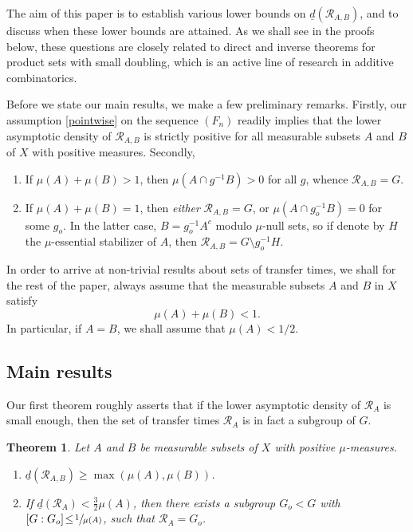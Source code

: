 \documentclass[JEP,XML,SOM,Unicode]{cedram}
\let\mathcal\mathscr
\newcommand{\cR}{\mathcal{R}}
\theoremstyle{plain}
\newtheorem{theorem}{Theorem}[section]
\theoremstyle{definition}
\begin{document}
The aim of this paper is to establish various lower bounds on $\underline{d}(\cR_{A,B})$, and to discuss when these lower bounds are attained. As we shall see in the proofs below, these questions are closely related to direct and inverse theorems for product sets with small doubling, which is an active line of research in additive combinatorics.

Before we state our main results, we make a few preliminary remarks. Firstly, our assumption \eqref{pointwise} on the sequence $(F_n)$ readily implies that the lower asymptotic density of $\cR_{A,B}$ is strictly positive for all measurable subsets $A$ and $B$ of $X$ with positive measures. Secondly,

\begin{enumerate}
\item
If $\mu(A) + \mu(B) > 1$, then $\mu(A \cap g^{-1}B) >0$ for all $g$, whence $\cR_{A,B} = G$.
\item
If $\mu(A) + \mu(B) = 1$, then \emph{either} $\cR_{A,B} = G$, or $\mu(A \cap g_o^{-1}B) = 0$ for some $g_o$.
In the latter case, $B = g_o^{-1}A^c$ modulo $\mu$-null sets, so if denote by $H$ the $\mu$-essential stabilizer of $A$,
then $\cR_{A,B} = G \setminus g_o^{-1} H$.
\end{enumerate}

In order to arrive at non-trivial results about sets of transfer times, we shall for the rest of the paper, always assume that the measurable
subsets $A$ and $B$ in $X$ satisfy
\begin{equation}
\label{standass}
\mu(A) + \mu(B) < 1.
\end{equation}
In particular, if $A = B$, we shall assume that $\mu(A) < 1/2$.

\subsection{Main results}

Our first theorem roughly asserts that if the lower asymptotic density of $\cR_A$ is small enough, then the set of transfer times $\cR_A$ is in fact a
subgroup of $G$.
\begin{theorem}
\label{thm1}
Let $A$ and $B$ be measurable subsets of $X$ with positive $\mu$-measures.

\begin{enumerate}
\item\label{thm1i}
$\underline{d}(\cR_{A,B}) \geq \max(\mu(A),\mu(B))$.
\item\label{thm1ii}
If $\underline{d}(\cR_A)\!<\!\frac{3}{2} \mu(A)$, then there exists a subgroup $G_o\!<\!G$ with
$[G : G_o]\!\leq\!\sfrac{1}{\mu(A)}$, such that $\cR_A = G_o$.
\end{enumerate}
\end{theorem}
\end{document}
